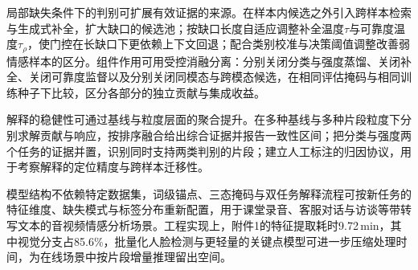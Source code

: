 局部缺失条件下的判别可扩展有效证据的来源。在样本内候选之外引入跨样本检索与生成式补全，扩大缺口的候选池；按缺口长度自适应调整补全温度$\tau$与可靠度温度$\tau_\rho$，使门控在长缺口下更依赖上下文回退；配合类别校准与决策阈值调整改善弱情感样本的区分。组件作用可用受控消融分离：分别关闭分类与强度蒸馏、关闭补全、关闭可靠度监督以及分别关闭同模态与跨模态候选，在相同评估掩码与相同训练种子下比较，区分各部分的独立贡献与集成收益。

解释的稳健性可通过基线与粒度层面的聚合提升。在多种基线与多种片段粒度下分别求解贡献与响应，按排序融合给出综合证据并报告一致性区间；把分类与强度两个任务的证据并置，识别同时支持两类判别的片段；建立人工标注的归因协议，用于考察解释的定位精度与跨样本迁移性。

模型结构不依赖特定数据集，词级锚点、三态掩码与双任务解释流程可按新任务的特征维度、缺失模式与标签分布重新配置，用于课堂录音、客服对话与访谈等带转写文本的音视频情感分析场景。工程实现上，附件1的特征提取耗时9.72\,min，其中视觉分支占85.6\%，批量化人脸检测与更轻量的关键点模型可进一步压缩处理时间，为在线场景中按片段增量推理留出空间。
